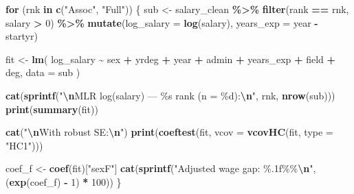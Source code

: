 \documentclass[
]{article}
\newenvironment{Shaded}{\begin{snugshade}}{\end{snugshade}}
\newcommand{\AttributeTok}[1]{\textcolor[rgb]{0.13,0.29,0.53}{#1}}
\newcommand{\ControlFlowTok}[1]{\textcolor[rgb]{0.13,0.29,0.53}{\textbf{#1}}}
\newcommand{\DecValTok}[1]{\textcolor[rgb]{0.00,0.00,0.81}{#1}}
\newcommand{\FunctionTok}[1]{\textcolor[rgb]{0.13,0.29,0.53}{\textbf{#1}}}
\newcommand{\NormalTok}[1]{#1}
\newcommand{\OtherTok}[1]{\textcolor[rgb]{0.56,0.35,0.01}{#1}}
\newcommand{\SpecialCharTok}[1]{\textcolor[rgb]{0.81,0.36,0.00}{\textbf{#1}}}
\newcommand{\StringTok}[1]{\textcolor[rgb]{0.31,0.60,0.02}{#1}}
\begin{document}
\begin{Shaded}
\begin{Highlighting}[]
\ControlFlowTok{for}\NormalTok{ (rnk }\ControlFlowTok{in} \FunctionTok{c}\NormalTok{(}\StringTok{"Assoc"}\NormalTok{, }\StringTok{"Full"}\NormalTok{)) \{}
\NormalTok{  sub }\OtherTok{\textless{}{-}}\NormalTok{ salary\_clean }\SpecialCharTok{\%\textgreater{}\%}
    \FunctionTok{filter}\NormalTok{(rank }\SpecialCharTok{==}\NormalTok{ rnk, salary }\SpecialCharTok{\textgreater{}} \DecValTok{0}\NormalTok{) }\SpecialCharTok{\%\textgreater{}\%}
    \FunctionTok{mutate}\NormalTok{(}\AttributeTok{log\_salary =} \FunctionTok{log}\NormalTok{(salary), }\AttributeTok{years\_exp =}\NormalTok{ year }\SpecialCharTok{{-}}\NormalTok{ startyr)}

\NormalTok{  fit }\OtherTok{\textless{}{-}} \FunctionTok{lm}\NormalTok{(}
\NormalTok{    log\_salary }\SpecialCharTok{\textasciitilde{}}\NormalTok{ sex }\SpecialCharTok{+}\NormalTok{ yrdeg }\SpecialCharTok{+}\NormalTok{ year }\SpecialCharTok{+}\NormalTok{ admin }\SpecialCharTok{+}\NormalTok{ years\_exp }\SpecialCharTok{+}\NormalTok{ field }\SpecialCharTok{+}\NormalTok{ deg,}
    \AttributeTok{data =}\NormalTok{ sub}
\NormalTok{  )}

  \FunctionTok{cat}\NormalTok{(}\FunctionTok{sprintf}\NormalTok{(}\StringTok{"}\SpecialCharTok{\textbackslash{}n}\StringTok{MLR log(salary) — \%s rank (n = \%d):}\SpecialCharTok{\textbackslash{}n}\StringTok{"}\NormalTok{, rnk, }\FunctionTok{nrow}\NormalTok{(sub)))}
  \FunctionTok{print}\NormalTok{(}\FunctionTok{summary}\NormalTok{(fit))}

  \FunctionTok{cat}\NormalTok{(}\StringTok{"}\SpecialCharTok{\textbackslash{}n}\StringTok{With robust SE:}\SpecialCharTok{\textbackslash{}n}\StringTok{"}\NormalTok{)}
  \FunctionTok{print}\NormalTok{(}\FunctionTok{coeftest}\NormalTok{(fit, }\AttributeTok{vcov =} \FunctionTok{vcovHC}\NormalTok{(fit, }\AttributeTok{type =} \StringTok{"HC1"}\NormalTok{)))}

\NormalTok{  coef\_f }\OtherTok{\textless{}{-}} \FunctionTok{coef}\NormalTok{(fit)[}\StringTok{"sexF"}\NormalTok{]}
  \FunctionTok{cat}\NormalTok{(}\FunctionTok{sprintf}\NormalTok{(}\StringTok{"Adjusted wage gap: \%.1f\%\%}\SpecialCharTok{\textbackslash{}n}\StringTok{"}\NormalTok{, (}\FunctionTok{exp}\NormalTok{(coef\_f) }\SpecialCharTok{{-}} \DecValTok{1}\NormalTok{) }\SpecialCharTok{*} \DecValTok{100}\NormalTok{))}
\NormalTok{\}}
\end{Highlighting}
\end{Shaded}
\end{document}
